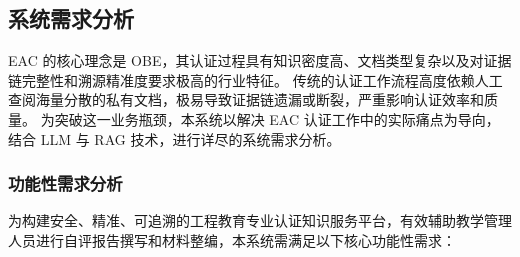\documentclass[UTF8,a4paper,zihao=-4]{ctexart}
\begin{document}
\subsection{系统需求分析}
EAC 的核心理念是 OBE，其认证过程具有知识密度高、文档类型复杂以及对证据链完整性和溯源精准度要求极高的行业特征。
传统的认证工作流程高度依赖人工查阅海量分散的私有文档，极易导致证据链遗漏或断裂，严重影响认证效率和质量。
为突破这一业务瓶颈，本系统以解决 EAC 认证工作中的实际痛点为导向，结合 LLM 与 RAG 技术，进行详尽的系统需求分析。

\subsubsection{功能性需求分析}
为构建安全、精准、可追溯的工程教育专业认证知识服务平台，有效辅助教学管理人员进行自评报告撰写和材料整编，本系统需满足以下核心功能性需求：
\end{document}
